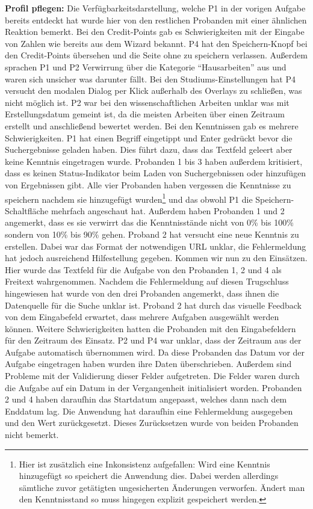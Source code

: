 \documentclass[
  12pt,
  ngerman,
  a4paper,
]{article}
\begin{document}
\textbf{Profil pflegen:} Die Verfügbarkeitsdarstellung, welche P1 in der
vorigen Aufgabe bereits entdeckt hat wurde hier von den restlichen
Probanden mit einer ähnlichen Reaktion bemerkt. Bei den Credit-Points
gab es Schwierigkeiten mit der Eingabe von Zahlen wie bereits aus dem
Wizard bekannt. P4 hat den Speichern-Knopf bei den Credit-Points
übersehen und die Seite ohne zu speichern verlassen. Außerdem sprachen
P1 und P2 Verwirrung über die Kategorie ``Hausarbeiten'' aus und waren
sich unsicher was darunter fällt. Bei den Studiums-Einstellungen hat P4
versucht den modalen Dialog per Klick außerhalb des Overlays zu
schließen, was nicht möglich ist. P2 war bei den wissenschaftlichen
Arbeiten unklar was mit Erstellungsdatum gemeint ist, da die meisten
Arbeiten über einen Zeitraum erstellt und anschließend bewertet werden.
Bei den Kenntnissen gab es mehrere Schwierigkeiten. P1 hat einen Begriff
eingetippt und Enter gedrückt bevor die Suchergebnisse geladen haben.
Dies führt dazu, dass das Textfeld geleert aber keine Kenntnis
eingetragen wurde. Probanden 1 bis 3 haben außerdem kritisiert, dass es
keinen Status-Indikator beim Laden von Suchergebnissen oder hinzufügen
von Ergebnissen gibt. Alle vier Probanden haben vergessen die Kenntnisse
zu speichern nachdem sie hinzugefügt wurden\footnote{Hier ist zusätzlich
  eine Inkonsistenz aufgefallen: Wird eine Kenntnis hinzugefügt so
  speichert die Anwendung dies. Dabei werden allerdings sämtliche zuvor
  getätigten ungesicherten Änderungen verworfen. Ändert man den
  Kenntnisstand so muss hingegen explizit gespeichert werden.} und das
obwohl P1 die Speichern-Schaltfläche mehrfach angeschaut hat. Außerdem
haben Probanden 1 und 2 angemerkt, dass es sie verwirrt das die
Kenntnisstände nicht von 0\% bis 100\% sondern von 10\% bis 90\% gehen.
Proband 2 hat versucht eine neue Kenntnis zu erstellen. Dabei war das
Format der notwendigen URL unklar, die Fehlermeldung hat jedoch
ausreichend Hilfestellung gegeben. Kommen wir nun zu den Einsätzen. Hier
wurde das Textfeld für die Aufgabe von den Probanden 1, 2 und 4 als
Freitext wahrgenommen. Nachdem die Fehlermeldung auf diesen Trugschluss
hingewiesen hat wurde von den drei Probanden angemerkt, dass ihnen die
Datenquelle für die Suche unklar ist. Proband 2 hat durch das visuelle
Feedback von dem Eingabefeld erwartet, dass mehrere Aufgaben ausgewählt
werden können. Weitere Schwierigkeiten hatten die Probanden mit den
Eingabefeldern für den Zeitraum des Einsatz. P2 und P4 war unklar, dass
der Zeitraum aus der Aufgabe automatisch übernommen wird. Da diese
Probanden das Datum vor der Aufgabe eingetragen haben wurden ihre Daten
überschrieben. Außerdem sind Probleme mit der Validierung dieser Felder
aufgetreten. Die Felder waren durch die Aufgabe auf ein Datum in der
Vergangenheit initialisiert worden. Probanden 2 und 4 haben daraufhin
das Startdatum angepasst, welches dann nach dem Enddatum lag. Die
Anwendung hat daraufhin eine Fehlermeldung ausgegeben und den Wert
zurückgesetzt. Dieses Zurücksetzen wurde von beiden Probanden nicht
bemerkt.
\end{document}
